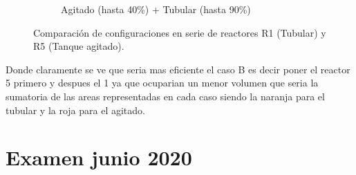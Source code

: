 \begin{figure}[htbp]
\begin{subfigure}[b]{0.48\textwidth}
		\caption{Agitado (hasta 40\%) + Tubular (hasta 90\%)}
		\label{fig:levenspiel_b}
	\end{subfigure}
	\caption{Comparación de configuraciones en serie de reactores R1 (Tubular) y R5 (Tanque agitado).}
	\label{fig:levenspiel_serie}
\end{figure}
\noindent Donde claramente se ve que seria mas eficiente el caso B es decir poner el reactor 5 primero y despues el 1 ya que ocuparian un menor volumen que seria la sumatoria de las areas representadas en cada caso siendo la naranja para el tubular y la roja para el agitado.
\newpage
\section{Examen junio 2020}

